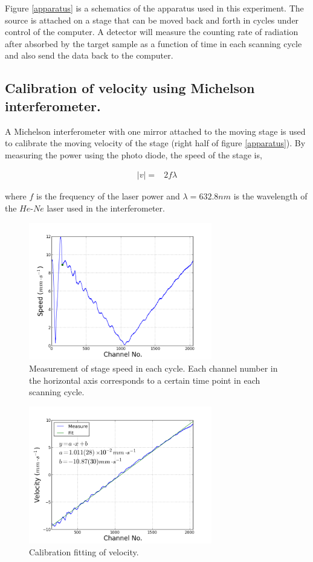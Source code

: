 \documentclass[aps,twocolumn,secnumarabic,balancelastpage,amsmath,amssymb,nofootinbib]{revtex4}
\newcommand{\eqar}[1]
{
  \begin{align*}
    #1
  \end{align*}
}
\newcommand{\abs}[1]{{\left|{#1}\right|}}
\begin{document}
Figure \ref{apparatus} is a schematics of the apparatus used in this experiment. The source is attached on a stage that can be moved back and forth in cycles under control of the computer. A detector will measure the counting rate of radiation after absorbed by the target sample as a function of time in each scanning cycle and also send the data back to the computer.

\subsection{Calibration of velocity using Michelson interferometer.}
A Michelson interferometer with one mirror attached to the moving stage is used to calibrate the moving velocity of the stage (right half of figure \ref{apparatus}). By measuring the power using the photo diode, the speed of the stage is,
\eqar{
  \abs{v}=&2f\lambda
}
where $f$ is the frequency of the laser power and $\lambda=632.8nm$ is the wavelength of the $He$-$Ne$ laser used in the interferometer.
\begin{figure}
  \includegraphics[width=8cm]{../pos_cal/res_v_raw.png}
  \caption{Measurement of stage speed in each cycle. Each channel number in the horizontal axis corresponds to a certain time point in each scanning cycle.}
  \label{v_raw}
\end{figure}
\begin{figure}
  \includegraphics[width=8cm]{../pos_cal/res_v_fit.png}
  \caption{Calibration fitting of velocity.}
  \label{v_fit}
\end{figure}
\end{document}
